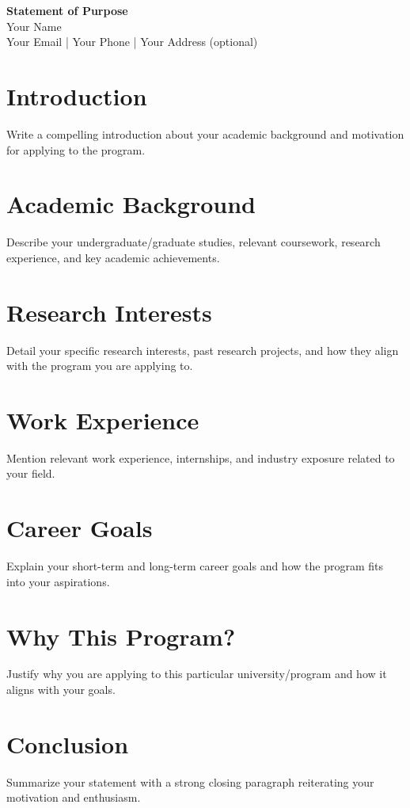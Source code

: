\documentclass[11pt,a4paper]{article}
\begin{document}
\begin{center}
    {\Large \textbf{Statement of Purpose}}\\[10pt]
    {\large Your Name}\\[5pt]
    {\normalsize Your Email | Your Phone | Your Address (optional)}
\end{center}

\section*{Introduction}
Write a compelling introduction about your academic background and motivation for applying to the program.

\section*{Academic Background}
Describe your undergraduate/graduate studies, relevant coursework, research experience, and key academic achievements.

\section*{Research Interests}
Detail your specific research interests, past research projects, and how they align with the program you are applying to.

\section*{Work Experience}
Mention relevant work experience, internships, and industry exposure related to your field.

\section*{Career Goals}
Explain your short-term and long-term career goals and how the program fits into your aspirations.

\section*{Why This Program?}
Justify why you are applying to this particular university/program and how it aligns with your goals.

\section*{Conclusion}
Summarize your statement with a strong closing paragraph reiterating your motivation and enthusiasm.
\end{document}
